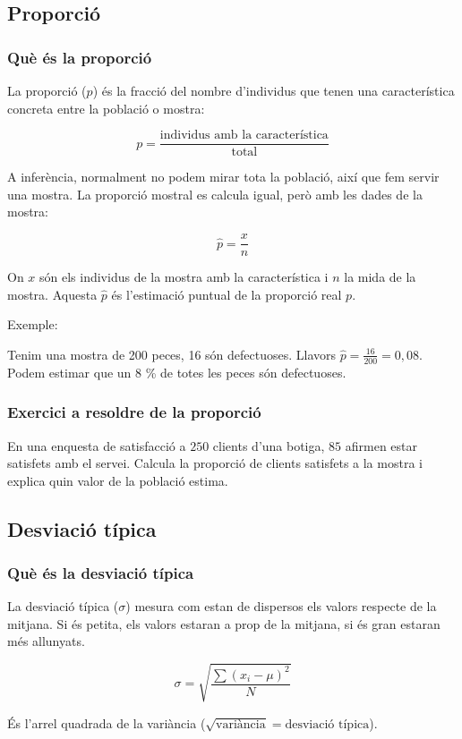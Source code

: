 \subsection{Proporció}
\subsubsection{Què és la proporció}
La proporció ($p$) és la fracció del nombre d'individus que tenen una característica concreta entre la població o mostra:

$$p = \frac{\mbox{individus amb la característica}}{\mbox{total}}$$

A inferència, normalment no podem mirar tota la població, així que fem servir una mostra. La proporció mostral es calcula igual, però amb les dades de la mostra:

$$\hat{p} = \frac{x}{n}$$

On $x$ són els individus de la mostra amb la característica i $n$ la mida de la mostra. Aquesta $\hat{p}$ és l'estimació puntual de la proporció real $p$.

Exemple:

Tenim una mostra de 200 peces, 16 són defectuoses. Llavors $\hat p = \frac{16}{200} = 0{,}08$. Podem estimar que un 8 \% de totes les peces són defectuoses.

\subsubsection{Exercici a resoldre de la proporció}
En una enquesta de satisfacció a $250$ clients d'una botiga, $85$ afirmen estar satisfets amb el servei. Calcula la proporció de clients satisfets a la mostra i explica quin valor de la població estima.

\subsection{Desviació típica}
\subsubsection{Què és la desviació típica}
\label{desviació-típica}
La desviació típica ($\sigma$) mesura com estan de dispersos els valors respecte de la mitjana. Si és petita, els valors estaran a prop de la mitjana, si és gran estaran més allunyats.

$$\sigma = \sqrt{\frac{\sum (x_i - \mu)^2}{N}}$$

És l'arrel quadrada de la variància ($\sqrt{\mbox{variància}} = \mbox{desviació típica}$).


